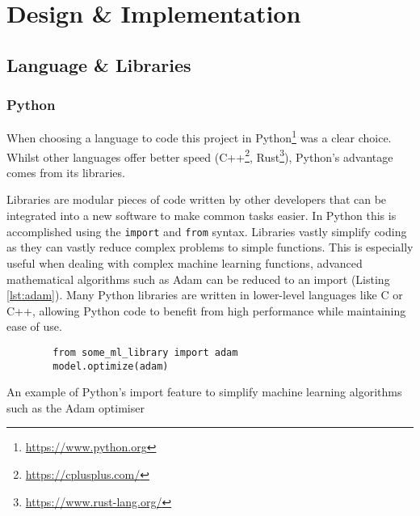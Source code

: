 \chapter{Design \& Implementation}
\label{ch:design-implementation}

\section{Language \& Libraries}


\subsection{Python}

When choosing a language to code this project in Python\footnote{\url{https://www.python.org}} was a clear choice. Whilst other languages offer better speed (C++\footnote{\url{https://cplusplus.com/}}, Rust\footnote{\url{https://www.rust-lang.org/}}), Python's advantage comes from its libraries.

Libraries are modular pieces of code written by other developers that can be integrated into a new software to make common tasks easier. In Python this is accomplished using the \verb|import| and \verb|from| syntax. Libraries vastly simplify coding as they can vastly reduce complex problems to simple functions. This is especially useful when dealing with complex machine learning functions, advanced mathematical algorithms such as Adam can be reduced to an import (Listing \ref{lst:adam}). Many Python libraries are written in lower-level languages like C or C++, allowing Python code to benefit from high performance while maintaining ease of use.

\begin{listing}[H]
    \begin{verbatim}
        from some_ml_library import adam
        model.optimize(adam)
    \end{verbatim}
    \caption{An example of Python's import feature to simplify machine learning algorithms such as the Adam optimiser}
    \label{lst:adam}
\end{listing}

